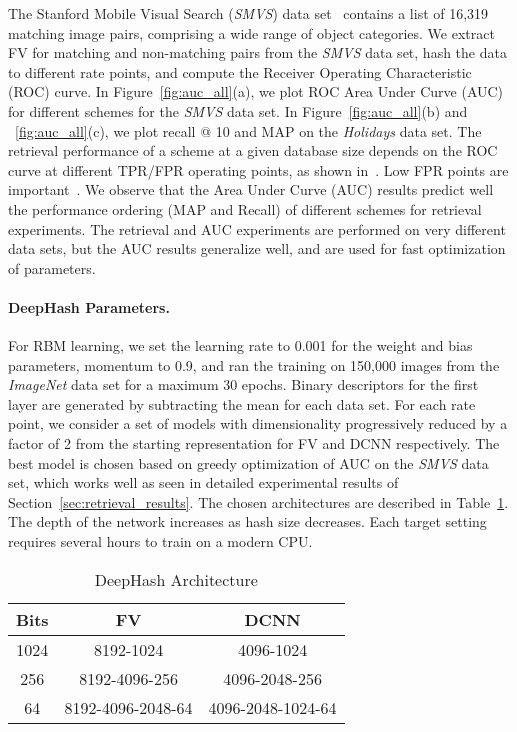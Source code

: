 \documentclass[10pt,twocolumn,letterpaper]{article}
\begin{document}
The Stanford Mobile Visual Search ({\it SMVS}) data set~\cite{SVMSDataSet} contains a list of 16,319 matching image pairs, comprising a wide range of object categories.
We extract FV for matching and non-matching pairs from the {\it SMVS} data set, hash the data to different rate points, and compute the Receiver Operating Characteristic (ROC) curve.
In Figure~\ref{fig:auc_all}(a), we plot ROC Area Under Curve (AUC) for different schemes for the {\it SMVS} data set. 
In Figure~\ref{fig:auc_all}(b) and ~\ref{fig:auc_all}(c), we plot recall @ 10 and MAP on the {\it Holidays} data set. 
The retrieval performance of a scheme at a given database size depends on the ROC curve at different TPR/FPR operating points, as shown in~\cite{DavidChenThesis}.
Low FPR points are important~\cite{DavidChenThesis,REVV1}.
We observe that the Area Under Curve (AUC) results predict well the performance ordering (MAP and Recall) of different schemes for retrieval experiments.
The retrieval and AUC experiments are performed on very different data sets, but the AUC results generalize well, and are used for fast optimization of parameters.

\vspace{-0.1em}
\paragraph{DeepHash Parameters.}

For RBM learning, we set the learning rate to 0.001 for the weight and bias parameters, momentum to 0.9, and ran the training on 150,000 images from the {\it ImageNet} data set for a maximum 30 epochs. 
Binary descriptors for the first layer are generated by subtracting the mean for each data set.
For each rate point, we consider a set of models with dimensionality progressively reduced by a factor of 2 from the starting representation for FV and DCNN respectively.
The best model is chosen based on greedy optimization of AUC on the {\it SMVS} data set, which works well as seen in detailed experimental results of Section~\ref{sec:retrieval_results}.
The chosen architectures are described in Table~\ref{tab:rbm_params}.
The depth of the network increases as hash size decreases.
Each target setting requires several hours to train on a modern CPU.


\begin{table}
\centering
\begin{tabular}{|c|c|c|}
\hline
Bits 		& 	FV  				& 	DCNN  			\\
\hline
1024 		& 	8192-1024 			& 	4096-1024 		\\
\hline
256 		& 	8192-4096-256 		& 	4096-2048-256 		\\
\hline
64 			& 	8192-4096-2048-64 	& 	4096-2048-1024-64 		\\
\hline
\end{tabular}
\caption{DeepHash Architecture}
\label{tab:rbm_params}
\end{table}
\end{document}
